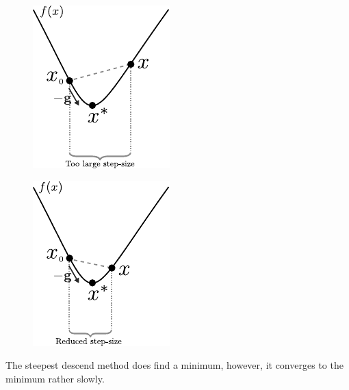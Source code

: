 \begin{minipage}{\linewidth}
	\begin{minipage}{0.45\linewidth}
		\begin{figure}[H]
			\includegraphics[scale=1.4]{figures/gradientDescendLargeStep}
			\centering
			\captionsetup{justification=centering}
			\label{SteepestDescendLargeStep}
		\end{figure}
	\end{minipage}
	\hspace{0.03\linewidth}
	\begin{minipage}{0.45\linewidth}
		\begin{figure}[H]
			\includegraphics[scale=1.4]{figures/gradientDescendReducedStep}
			\centering
			\captionsetup{justification=centering}
			\label{SteepestDescendSmallStep}
		\end{figure}
	\end{minipage}
\end{minipage}

The steepest descend method does find a minimum, however, it converges to the minimum rather slowly.

